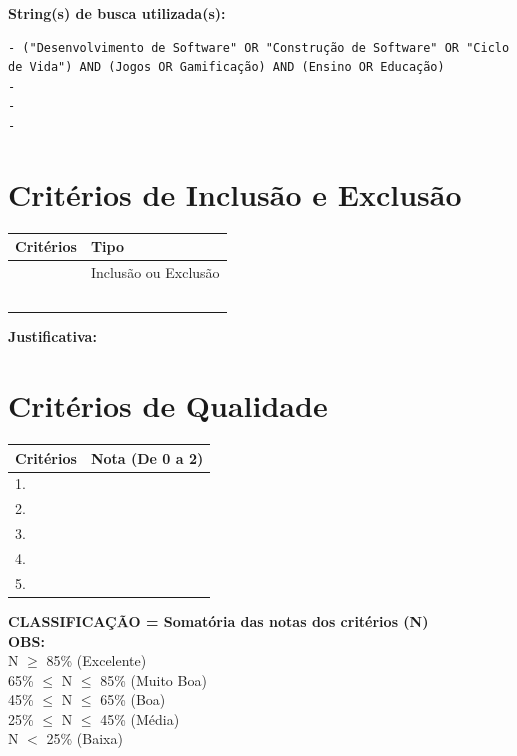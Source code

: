 \documentclass[12pt,a4paper]{article}
\begin{document}
\vspace{0.5cm}
\noindent \textbf{String(s) de busca utilizada(s):}
\begin{verbatim}
- ("Desenvolvimento de Software" OR "Construção de Software" OR "Ciclo de Vida") AND (Jogos OR Gamificação) AND (Ensino OR Educação)
- 
- 
- 
\end{verbatim}

\newpage
\section*{Critérios de Inclusão e Exclusão}

\begin{table}[h]
\centering
\begin{tabular}{|p{10cm}|p{5cm}|}
\hline
\textbf{Critérios} & \textbf{Tipo} \\
\hline
 & Inclusão ou Exclusão \\
\hline
 & \\
\hline
 & \\
\hline
 & \\
\hline
 & \\
\hline
 & \\
\hline
\end{tabular}
\end{table}

\noindent \textbf{Justificativa:} \hrulefill

\vspace{0.5cm}
\section*{Critérios de Qualidade}

\begin{table}[h]
\centering
\begin{tabular}{|p{10cm}|p{4cm}|}
\hline
\textbf{Critérios} & \textbf{Nota (De 0 a 2)} \\
\hline
1. & \\
\hline
2. & \\
\hline
3. & \\
\hline
4. & \\
\hline
5. & \\
\hline
\end{tabular}
\end{table}

\noindent \textbf{CLASSIFICAÇÃO = Somatória das notas dos critérios (N)} \\
\textbf{OBS:} \\
N $\ge$ 85\% (Excelente) \\
65\% $\le$ N $\le$ 85\% (Muito Boa) \\
45\% $\le$ N $\le$ 65\% (Boa) \\
25\% $\le$ N $\le$ 45\% (Média) \\
N $<$ 25\% (Baixa)
\end{document}
